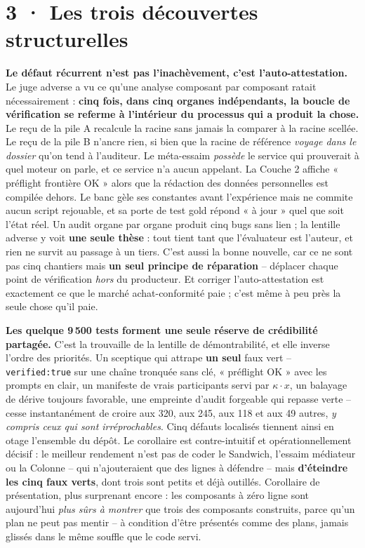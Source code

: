 \documentclass[10pt]{article}
\newcommand{\code}[1]{\texttt{\small #1}}
\begin{document}
\section{3 · Les trois découvertes structurelles}

\textbf{Le défaut récurrent n'est pas l'inachèvement, c'est l'auto-attestation.} Le juge adverse a vu ce
qu'une analyse composant par composant ratait nécessairement : \textbf{cinq fois, dans cinq organes
indépendants, la boucle de vérification se referme à l'intérieur du processus qui a produit la chose.}
Le reçu de la pile A recalcule la racine sans jamais la comparer à la racine scellée. Le reçu de la pile
B n'ancre rien, si bien que la racine de référence \emph{voyage dans le dossier} qu'on tend à l'auditeur.
Le méta-essaim \emph{possède} le service qui prouverait à quel moteur on parle, et ce service n'a aucun
appelant. La Couche 2 affiche « préflight frontière OK » alors que la rédaction des données personnelles
est compilée dehors. Le banc gèle ses constantes avant l'expérience mais ne commite aucun script
rejouable, et sa porte de test gold répond « à jour » quel que soit l'état réel. Un audit organe par
organe produit cinq bugs sans lien ; la lentille adverse y voit \textbf{une seule thèse} : tout tient
tant que l'évaluateur est l'auteur, et rien ne survit au passage à un tiers. C'est aussi la bonne
nouvelle, car ce ne sont pas cinq chantiers mais \textbf{un seul principe de réparation} -- déplacer
chaque point de vérification \emph{hors} du producteur. Et corriger l'auto-attestation est exactement ce
que le marché achat-conformité paie ; c'est même à peu près la seule chose qu'il paie.

\textbf{Les quelque 9\,500 tests forment une seule réserve de crédibilité partagée.} C'est la trouvaille
de la lentille de démontrabilité, et elle inverse l'ordre des priorités. Un sceptique qui attrape
\textbf{un seul} faux vert -- \code{verified:true} sur une chaîne tronquée sans clé, « préflight OK »
avec les prompts en clair, un manifeste de vrais participants servi par $\kappa \cdot x$, un balayage de
dérive toujours favorable, une empreinte d'audit forgeable qui repasse verte -- cesse instantanément de
croire aux 320, aux 245, aux 118 et aux 49 autres, \emph{y compris ceux qui sont irréprochables}. Cinq
défauts localisés tiennent ainsi en otage l'ensemble du dépôt. Le corollaire est contre-intuitif et
opérationnellement décisif : le meilleur rendement n'est pas de coder le Sandwich, l'essaim médiateur ou
la Colonne -- qui n'ajouteraient que des lignes à défendre -- mais \textbf{d'éteindre les cinq faux
verts}, dont trois sont petits et déjà outillés. Corollaire de présentation, plus surprenant encore :
les composants à zéro ligne sont aujourd'hui \emph{plus sûrs à montrer} que trois des composants
construits, parce qu'un plan ne peut pas mentir -- à condition d'être présentés comme des plans, jamais
glissés dans le même souffle que le code servi.
\end{document}
